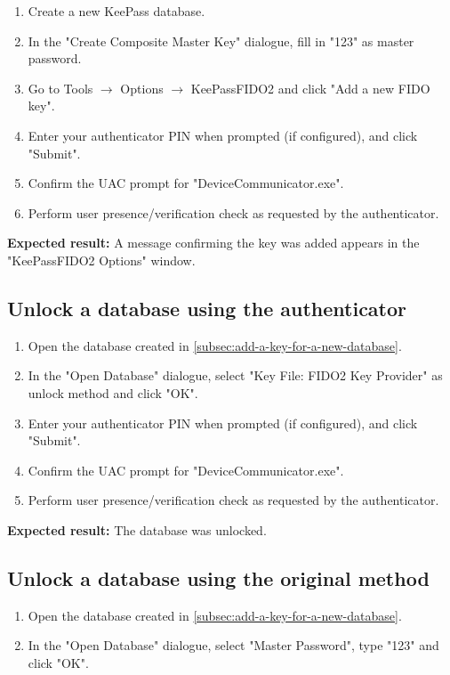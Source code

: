 \begin{enumerate}
	\item Create a new KeePass database.
	\item In the "Create Composite Master Key" dialogue, fill in "123" as master password.
	\item Go to Tools $\rightarrow$ Options $\rightarrow$ KeePassFIDO2 and click "Add a new FIDO key".
	\item Enter your authenticator PIN when prompted (if configured), and click "Submit".
	\item Confirm the UAC prompt for "DeviceCommunicator.exe".
	\item Perform user presence/verification check as requested by the authenticator.
\end{enumerate}

\textbf{Expected result:}
A message confirming the key was added appears in the "KeePassFIDO2 Options" window.

\subsection{Unlock a database using the authenticator}\label{subsec:unlock-a-database-using-the-authenticator}

\begin{enumerate}
	\item Open the database created in \autoref{subsec:add-a-key-for-a-new-database}.
	\item In the "Open Database" dialogue, select "Key File: FIDO2 Key Provider" as unlock method and click "OK".
	\item Enter your authenticator PIN when prompted (if configured), and click "Submit".
	\item Confirm the UAC prompt for "DeviceCommunicator.exe".
	\item Perform user presence/verification check as requested by the authenticator.
\end{enumerate}

\textbf{Expected result:}
The database was unlocked.

\subsection{Unlock a database using the original method}\label{subsec:unlock-a-database-using-the-original-method}

\begin{enumerate}
	\item Open the database created in \autoref{subsec:add-a-key-for-a-new-database}.
	\item In the "Open Database" dialogue, select "Master Password", type "123" and click "OK".
\end{enumerate}

